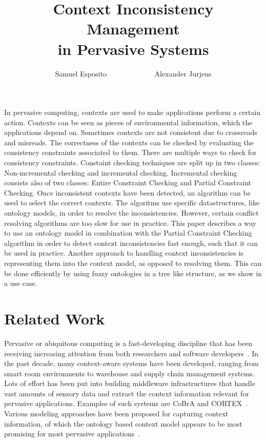 \documentclass[journal]{vgtc}                %
\title{Context Inconsistency Management \\in Pervasive Systems}
\author{Samuel Esposito ~~~~~~~~~~~~ Alexander Jurjens}
\begin{document}


\maketitle

In pervasive computing, contexts are used to make applications perform a certain action. Contexts can be seen as pieces of environmental information, which the applications depend on. Sometimes contexts are not consistent due to crossreads and misreads. The correctness of the contexts can be checked by evaluating the consistency constraints associated to them. There are multiple ways to check for consistency constraints. Constaint checking techniques are split up in two classes: Non-incremental checking and incremental checking. Incremental checking consists also of two classes: Entire Constraint Checking and Partial Constraint Checking. Once inconsistent contexts have been detected, an algorithm can be used to select the correct contexts. The algoritms use specific datastructures, like ontology models, in order to resolve the inconsistencies. However, certain conflict resolving algorithms are too slow for use in practice. This paper describes a way to use an ontology model in combination with the Partial Constraint Checking algorithm in order to detect context inconsistencies fast enough, such that it can be used in practice. Another approach to handling context inconsistencies is representing them into the context model, as opposed to resolving them. This can be done efficiently by using fuzzy ontologies in a tree like structure, as we show in a use case.

\section{Related Work}
Pervasive or ubiquitous computing is a fast-developing discipline that has been receiving increasing attention from both researchers and software developers~\cite{xu:2010:PCC}. In the past decade, many context-aware systems have been developed, ranging from smart room environments to warehouse and supply chain management systems. Lots of effort has been put into building middleware infrastructures that handle vast amounts of sensory data and extract the context information relevant for pervasive applications. Examples of such systems are CoBrA and CORTEX~\cite{bu:2006:CCM}. Various modeling approaches have been proposed for capturing context information, of which the ontology based context model appears to be most promising for most pervasive applications~\cite{bu:2006:CCM}.
\end{document}

